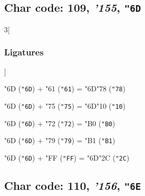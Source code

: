 \documentclass{article}
\newlength{\maxcharwidth}
\begin{document}
\subsection{Char code: 109, {\it'155}, {\tt"6D}}
\label{char_109}


\begin{multicols}{3}[\subsubsection{Ligatures}]

{\testfont\char"6D\noboundary} ({\tt"6D}) + {\testfont\char"61\noboundary} ({\tt"61}) = {\testfont\char"6D\noboundary}{\testfont\char"78\noboundary} ({\tt"78}) 

{\testfont\char"6D\noboundary} ({\tt"6D}) + {\testfont\char"75\noboundary} ({\tt"75}) = {\testfont\char"6D\noboundary}{\testfont\char"10\noboundary} ({\tt"10}) 

{\testfont\char"6D\noboundary} ({\tt"6D}) + {\testfont\char"72\noboundary} ({\tt"72}) = {\testfont\char"B0\noboundary} ({\tt"B0}) 

{\testfont\char"6D\noboundary} ({\tt"6D}) + {\testfont\char"79\noboundary} ({\tt"79}) = {\testfont\char"B1\noboundary} ({\tt"B1}) 

{\testfont\char"6D\noboundary} ({\tt"6D}) + {\testfont\char"FF\noboundary} ({\tt"FF}) = {\testfont\char"6D\noboundary}{\testfont\char"2C\noboundary} ({\tt"2C}) 

\end{multicols}

\subsection{Char code: 110, {\it'156}, {\tt"6E}}
\label{char_110}

\end{document}
